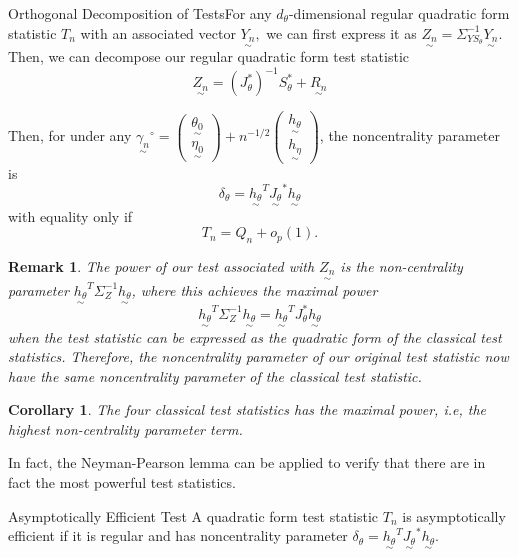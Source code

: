 \documentclass[twoside]{article}
\newtheorem{corollary}[theorem]{Corollary}
\newtheorem{remark}[theorem]{Remark}
\newcommand{\utilde}{\underset{\sim}}
\begin{document}
\begin{proposition_exam}{Orthogonal Decomposition of Tests}{}For any $d_{\theta}$-dimensional regular quadratic form statistic $T_n$ with an associated vector $\utilde{Y_n},$ we can first express it as $\utilde{Z_n} = \Sigma_{Y S_{\theta}}^{-1}\utilde{Y_n}.$ Then, we can decompose our regular quadratic form test statistic 
$$
\utilde{Z_n} = (J_{\theta}^{*})^{-1}S_{\theta}^{*} + \utilde{R_n}
$$

Then, for under any $\utilde{\gamma_n}^{\circ} = \begin{pmatrix} \utilde{\theta_0} \\ \utilde{\eta_0} \end{pmatrix} + n^{-1/2}\begin{pmatrix}\utilde{h_{\theta}}\\\utilde{h_{\eta}} \end{pmatrix}$, the noncentrality parameter is 
$$
\delta_{\theta} = \utilde{h_{\theta}}^T\utilde{J_{\theta}}^{*}\utilde{h_{\theta}}
$$
with equality only if 
$$
T_n = Q_n + o_p(1).
$$
\end{proposition_exam}

\begin{remark} The power of our test associated with $\utilde{Z_n}$ is the non-centrality parameter $\utilde{h_{\theta}}^T\Sigma_{Z}^{-1}\utilde{h_{\theta}}$, where this achieves the maximal power 
$$
\utilde{h_{\theta}}^T\Sigma_{Z}^{-1}\utilde{h_{\theta}} =  \utilde{h_{\theta}}^TJ_{\theta}^{*}\utilde{h_{\theta}}
$$
when the test statistic can be expressed as the quadratic form of the classical test statistics. Therefore, the noncentrality parameter of our original test statistic now have the same noncentrality parameter of the classical test statistic.
\end{remark}

\begin{corollary}The four classical test statistics has the maximal power, i.e, the highest non-centrality parameter term.
\end{corollary}

In fact, the Neyman-Pearson lemma can be applied to verify that there are in fact the most powerful test statistics.

\begin{definition_exam}{Asymptotically Efficient Test}{} A quadratic form test statistic $T_n$ is asymptotically efficient if it is regular and has noncentrality parameter $
\delta_{\theta} = \utilde{h_{\theta}}^T\utilde{J_{\theta}}^{*}\utilde{h_{\theta}}.
$
\end{definition_exam}
\end{document}
